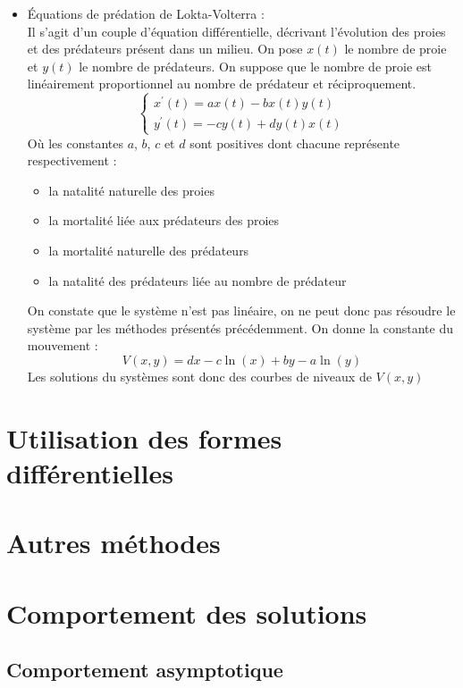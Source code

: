 \begin{ex}
\begin{itemize}
    \item Équations de prédation de Lokta-Volterra :\\
    Il s'agit d'un couple d'équation différentielle, décrivant l'évolution des proies et des prédateurs présent dans un milieu.
    On pose $x(t)$ le nombre de proie et $y(t)$ le nombre de prédateurs.
    On suppose que le nombre de proie est linéairement proportionnel au nombre de prédateur et réciproquement.
    $$\begin{cases}
    x^{\prime}(t)=ax(t)-bx(t)y(t)\\
    y^{\prime}(t)=-cy(t)+dy(t)x(t)
    \end{cases}$$
    Où les constantes $a$, $b$, $c$ et $d$ sont positives dont chacune représente respectivement :
    \begin{itemize}
        \item la natalité naturelle des proies
        \item la mortalité liée aux prédateurs des proies
        \item la mortalité naturelle des prédateurs
        \item la natalité des prédateurs liée au nombre de prédateur
    \end{itemize}
    On constate que le système n'est pas linéaire, on ne peut donc pas résoudre le système par les méthodes présentés précédemment.
    On donne la constante du mouvement :\\
    $$V(x,y)=dx-c\ln(x)+by-a\ln(y)$$
    Les solutions du systèmes sont donc des courbes de niveaux de $V(x,y)$
\end{itemize}
\end{ex}
\section{Utilisation des formes différentielles}
\section{Autres méthodes}


\section{Comportement des solutions}
\subsection{Comportement asymptotique}
